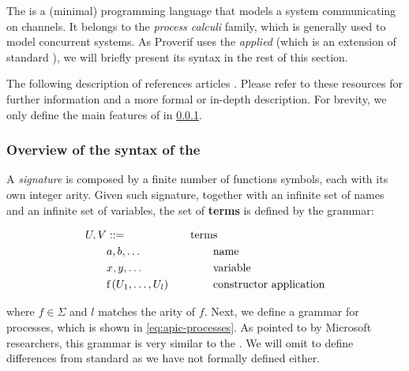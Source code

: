 The \pic{} \cite{pi-calculus-book} is a (minimal) programming language that models a system communicating on channels. It belongs to the \textit{process calculi} family, which is generally used to model concurrent systems. As Proverif uses the \textit{applied} \pic{} (which is an extension of standard \pic{}{}), we will briefly present its syntax in the rest of this section.

The following description of \apic{} references articles \cite{applied-pi-calculus-private-auth, applied-pi-calculus-abadi-1, applied-pi-calculus-abadi-2}. Please refer to these resources for further information and a more formal or in-depth description. For brevity, we only define the main features of \apic{} in \cref{subsub:syntax-apic}.

\subsubsection{Overview of the syntax of the \apic{}}
\label{subsub:syntax-apic}

A \textit{signature \textSigma} is composed by a finite number of functions symbols, each with its own integer arity. Given such signature, together with an infinite set of names and an infinite set of variables, the set of \textbf{terms} is defined by the grammar:

\begin{equation}
  \label{eq:apic-terms}
  \begin{aligned}
    U, V & ::=                        \\
         & a, b, \ldots               \\
         & x, y, \ldots               \\
         & \mbox{f}\left(U_1, \ldots, U_l\right)
  \end{aligned}
  \qquad
  \begin{aligned}
    \mbox{term} & \mbox{s}                       \\
                & \mbox{name}                    \\
                & \mbox{variable}                \\
                & \mbox{constructor application}
  \end{aligned}
\end{equation}

where $f \in \Sigma$ and $l$ matches the arity of $f$. Next, we define a grammar for processes, which is shown in \cref{eq:apic-processes}. As pointed to by Microsoft researchers, this grammar is very similar to the \pic{} \cite{applied-pi-calculus-private-auth}. We will omit to define differences from standard \pic{} as we have not formally defined \pic{} either.

